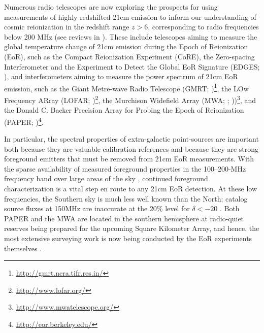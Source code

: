 \documentclass[preprint]{aastex}
\begin{document}
Numerous radio telescopes are now exploring the prospects for using
measurements of highly redshifted 21cm emission to inform our understanding of
cosmic reionization in the redshift range $z>6$, corresponding to radio
frequencies below 200 MHz (see reviews in
\citealt{Furlanetto:2006p2267,Morales:2010p8093,Pritchard:2012p9555}).  These
include telescopes aiming to measure the global temperature change of 21cm
emission during the Epoch of Reionization (EoR), such as the Compact
Reionization Experiment (CoRE), the Zero-spacing Interferometer \citep{Raghunathan:2011}  and the Experiment to Detect the Global EoR
Signature (EDGES; \citealt{Bowman:2010p8546}), and interferometers aiming to
measure the power spectrum of 21cm EoR emission, such as the Giant Metre-wave
Radio Telescope (GMRT;
\citealt{Paciga:2011p9470,Paciga:2013p9943})\footnote{\url{http://gmrt.ncra.tifr.res.in/}},
the LOw Frequency ARray (LOFAR;
\citealt{Yatawatta:2013p9699})\footnote{\url{http://www.lofar.org/}}, the
Murchison Widefield Array (MWA;  \citealt{Bowman:2013p9950};
\citealt{Tingay:2013p9022}))\footnote{\url{http://www.mwatelescope.org/}}, and
the Donald C. Backer Precision Array for Probing the Epoch of Reionization
(PAPER; \citealt{Parsons:2010p6757,Pober:2013p9942})\footnote{\url{http://eor.berkeley.edu/}}.

In particular, the spectral properties of extra-galactic point-sources are important
both because they are valuable calibration references
and because they are strong foreground emitters that must be removed from 21cm EoR measurements.
With the sparse availability of measured foreground properties in the
100--200-MHz frequency band over large areas of the sky \citep{deOliveiraCosta:2008p2242}, continued
foreground characterization is a
vital step en route to any 21cm EoR detection.
At these low
frequencies, the Southern sky is much less well known than the North;
catalog source fluxes at 150MHz are inaccurate at the 20\% level
for $\delta<-20$\arcdeg{} \citep{Slee:1995p7541,Vollmer:2005p6425}.
Both PAPER and the MWA are located in the southern hemisphere at radio-quiet
reserves being prepared for the upcoming Square Kilometer Array, and hence,
the
most extensive surveying work is now being conducted by the EoR experiments
themselves \citep{Jacobs:2011p8438,Williams:2012p8768,Bernardi:2013p9859}.
\end{document}
